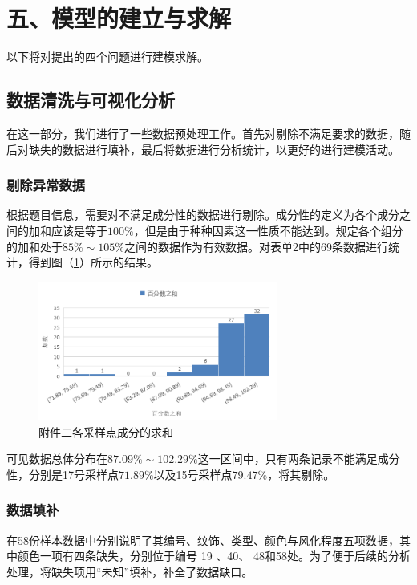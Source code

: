 \documentclass{my_paper}
\begin{document}
\section{五、模型的建立与求解}

以下将对提出的四个问题进行建模求解。
\subsection{数据清洗与可视化分析}
在这一部分，我们进行了一些数据预处理工作。首先对剔除不满足要求的数据，随后对缺失的数据进行填补，最后将数据进行分析统计，以更好的进行建模活动。

\subsubsection{剔除异常数据}
根据题目信息，需要对不满足成分性的数据进行剔除。成分性的定义为各个成分之间的加和应该是等于$ 100\% $，但是由于种种因素这一性质不能达到。规定各个组分的加和处于$85\%\sim 105\%$之间的数据作为有效数据。对表单2中的69条数据进行统计，得到图（\ref{51}）所示的结果。
\begin {figure}[h]
\centering %
\includegraphics[width=0.7\textwidth]{51.png}
\caption{附件二各采样点成分的求和} %
\label{51}
\end {figure}

可见数据总体分布在$87.09\%\sim 102.29\%$这一区间中，只有两条记录不能满足成分性，分别是17号采样点$71.89\%$以及15号采样点$79.47\%$，将其剔除。

\subsubsection{数据填补}
在58份样本数据中分别说明了其编号、纹饰、类型、颜色与风化程度五项数据，其中颜色一项有四条缺失，分别位于编号 19 、40、 48和58处。为了便于后续的分析处理，将缺失项用“未知”填补，补全了数据缺口。
\end{document}
